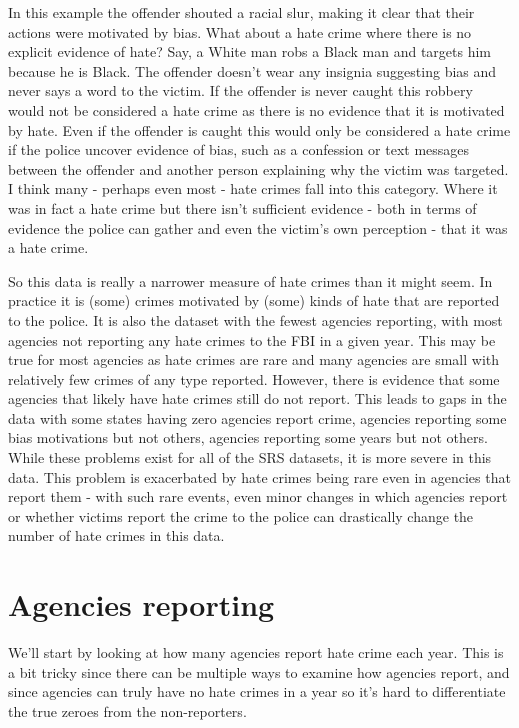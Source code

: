 \documentclass[
]{krantz}
\begin{document}
In this example the offender shouted a racial slur, making
it clear that their actions were motivated by bias. What
about a hate crime where there is no explicit evidence of
hate? Say, a White man robs a Black man and targets him
because he is Black. The offender doesn't wear any insignia
suggesting bias and never says a word to the victim. If the
offender is never caught this robbery would not be
considered a hate crime as there is no evidence that it is
motivated by hate. Even if the offender is caught this would
only be considered a hate crime if the police uncover
evidence of bias, such as a confession or text messages
between the offender and another person explaining why the
victim was targeted. I think many - perhaps even most - hate
crimes fall into this category. Where it was in fact a hate
crime but there isn't sufficient evidence - both in terms of
evidence the police can gather and even the victim's own
perception - that it was a hate crime.

So this data is really a narrower measure of hate crimes
than it might seem. In practice it is (some) crimes
motivated by (some) kinds of hate that are reported to the
police. It is also the dataset with the fewest agencies
reporting, with most agencies not reporting any hate crimes
to the FBI in a given year. This may be true for most
agencies as hate crimes are rare and many agencies are small
with relatively few crimes of any type reported. However,
there is evidence that some agencies that likely have hate
crimes still do not report. This leads to gaps in the data
with some states having zero agencies report crime, agencies
reporting some bias motivations but not others, agencies
reporting some years but not others. While these problems
exist for all of the SRS datasets, it is more severe in this
data. This problem is exacerbated by hate crimes being rare
even in agencies that report them - with such rare events,
even minor changes in which agencies report or whether
victims report the crime to the police can drastically
change the number of hate crimes in this data.

\section{Agencies reporting}\label{agencies-reporting-5}

We'll start by looking at how many agencies report hate
crime each year. This is a bit tricky since there can be
multiple ways to examine how agencies report, and since
agencies can truly have no hate crimes in a year so it's
hard to differentiate the true zeroes from the
non-reporters.
\end{document}
